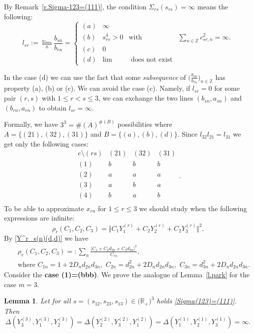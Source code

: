 \documentclass[preprint,12pt]{elsarticle}
\newtheorem{lem}[thm]{Lemma}
\numberwithin{equation}{section}
\begin{document}
%
By Remark~\ref{r.Sigma-123=(111)},  the condition $\Sigma_{rs}(s_{rs})=\infty$ means the following:
\begin{equation}
\label{l(sr)}
l_{sr}:=\lim_n\frac{b_{sn}}{b_{rn}}
=\!
\left\{\begin{array}{lccc}
(a)& \infty&&\\
(b)&s^{4}_{rs}>0&\text{with}&\sum_{n\in \mathbb Z}c^2_{sr,n}=\infty.\\
(c)&0&\\
(d)&\lim& \,\,\text{does not exist}
\end{array}\right.
\end{equation}
%
\begin{rem}
\label{r.b-arrange} 
In the case (d) we can use the fact that some {\it subsequence} of $\Big(\frac{b_{sn}}{b_{rn}}\Big)_{n\in \mathbb Z}$ has property (a), (b) or (c).
We can avoid the case (c). Namely, if $l_{sr}=0$ for some pair $(r,s)$ with $1\leq r<s\leq 3$, we can exchange the two lines $(b_{sn},a_{sn})$ and $(b_{rn},a_{rn})$ to obtain $l_{sr}=\infty$.
\end{rem}
Formally, we have $3^3=\#(A)^{\#(B)}$ possibilities where $A=\{(21),(32),(31)\}$ and $B=\{(a),(b),(d)\}$. Since $l_{32}l_{21}=l_{31}$  we get only the following cases: 
$$
\begin{array}{ccccc}
 e \setminus (rs) &(21)&(32)&(31)\\
(1)&b&b&b\\
(2)&a&a&a\\
(3)&a&b&a\\
(4)&b&a&b\\
\end{array}.
$$
%
To be able to approximate $x_{rn}$ for $1\leq r \leq 3$ we should study when the following expressions are infinite:
\begin{equation}
\label{rho(CCC)}
\rho_r(C_1,C_2,C_3)=
\Vert C_1Y_1^{(r)}+C_2Y_2^{(r)}+C_2Y_3^{(r)}\Vert ^2.
\end{equation}
By \eqref{Y^r_s(n)(d,d)} we have
\begin{eqnarray}
\label{rho_r(CCC)}
 &&
\rho_r(C_1,C_2,C_3)=
  :\sum_n\frac{\vert C_1+C_2d_{2n}+C_3d_{3n}\vert^2}
 {C_{rn}},\\
 \nonumber
  &&
\text{where}\,\,C_{1n}= 1\!+\!2D_nd_{2n}d_{3n},\,\,
C_{2n}= d_{2n}^2\!+\!2D_nd_{2n}d_{3n},\,\,C_{3n}= d_{3n}^2\!+\!2D_nd_{2n}d_{3n}.
 \end{eqnarray}
Consider the {\bf case 
 (1)=(bbb)}.
We prove the analogue of  Lemma~\ref{l.park} for the case $m=3$.
\begin{lem}
\label{l.park2}
Let 
for all $s=(s_{12},s_{23},s_{13})\in \big(\mathbb R_+\big)^3$ holds
\eqref{Sigma(123)=(111)}.
Then 
\begin{equation}
\label{3-Delta}
 \Delta(Y_3^{(3)},Y_1^{(3)},Y_2^{(3)})=
 \Delta(Y_2^{(2)},Y_3^{(2)},Y_1^{(2)})=
 \Delta(Y_1^{(1)},Y_2^{(1)},Y_3^{(1)})=\infty.
\end{equation}
\end{lem}
\end{document}
